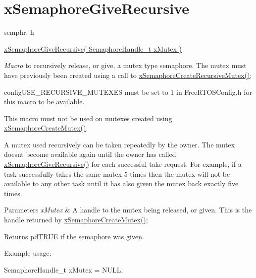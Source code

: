 \hypertarget{group__x_semaphore_give_recursive}{}\section{x\+Semaphore\+Give\+Recursive}
\label{group__x_semaphore_give_recursive}
semphr. h 
\begin{DoxyPre}\hyperlink{semphr_8h_a398d66b17856c22dd49d39aaac42f105}{xSemaphoreGiveRecursive( SemaphoreHandle\_t xMutex )}\end{DoxyPre}


{\itshape Macro} to recursively release, or \textquotesingle{}give\textquotesingle{}, a mutex type semaphore. The mutex must have previously been created using a call to \hyperlink{semphr_8h_a1bbc843be5a41ea83d2693b2189fc0f8}{x\+Semaphore\+Create\+Recursive\+Mutex()};

config\+U\+S\+E\+\_\+\+R\+E\+C\+U\+R\+S\+I\+V\+E\+\_\+\+M\+U\+T\+E\+X\+ES must be set to 1 in Free\+R\+T\+O\+S\+Config.\+h for this macro to be available.

This macro must not be used on mutexes created using \hyperlink{semphr_8h_aa6a00aa9b91a9e5b3ebe4ae1c3f115c6}{x\+Semaphore\+Create\+Mutex()}.

A mutex used recursively can be \textquotesingle{}taken\textquotesingle{} repeatedly by the owner. The mutex doesn\textquotesingle{}t become available again until the owner has called \hyperlink{semphr_8h_a398d66b17856c22dd49d39aaac42f105}{x\+Semaphore\+Give\+Recursive()} for each successful \textquotesingle{}take\textquotesingle{} request. For example, if a task successfully \textquotesingle{}takes\textquotesingle{} the same mutex 5 times then the mutex will not be available to any other task until it has also \textquotesingle{}given\textquotesingle{} the mutex back exactly five times.


\begin{DoxyParams}{Parameters}
{\em x\+Mutex} & A handle to the mutex being released, or \textquotesingle{}given\textquotesingle{}. This is the handle returned by \hyperlink{semphr_8h_aa6a00aa9b91a9e5b3ebe4ae1c3f115c6}{x\+Semaphore\+Create\+Mutex()};\\
\hline
\end{DoxyParams}
\begin{DoxyReturn}{Returns}
pd\+T\+R\+UE if the semaphore was given.
\end{DoxyReturn}
Example usage\+: 
\begin{DoxyPre}
SemaphoreHandle\_t xMutex = NULL;\end{DoxyPre}



